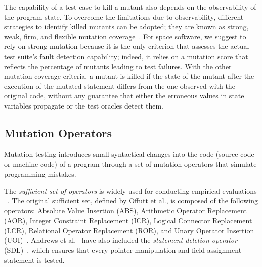 The capability of a test case to kill a mutant also depends on the observability of the program state. To overcome the limitations due to observability, different strategies to identify killed mutants can be adopted; they are known as strong, weak, firm, and flexible mutation coverage~\cite{ammann2016introduction}. For space software, we suggest to rely on strong mutation because it is the only criterion that assesses the actual test suite's fault detection capability; indeed, it relies on a mutation score that reflects the percentage of mutants leading to test failures. With the other mutation coverage criteria, a mutant is killed if the state of the mutant after the execution of the mutated statement differs from the one observed with the original code, without any guarantee that either the erroneous values in state variables propagate or the test oracles detect them. 




\subsection{Mutation Operators}
\label{sec:related:operators}

%


Mutation testing introduces small syntactical changes into the code (source code or machine code) of a program through a set of mutation operators that simulate programming mistakes. 



The  \emph{sufficient set of operators} is widely used for conducting empirical evaluations ~\cite{offutt1996experimental,rothermel1996experimental,andrews2005mutation,kintis2017detecting}. 
The original sufficient set, defined by Offutt et al., is composed of the following operators: Absolute Value Insertion (ABS), Arithmetic Operator Replacement (AOR), Integer Constraint Replacement (ICR), Logical Connector Replacement (LCR), Relational Operator Replacement (ROR), and Unary Operator Insertion (UOI)~\cite{offutt1996experimental}.
Andrews et al.~\cite{andrews2005mutation} have also included the 
\emph{statement deletion operator} (SDL)~\cite{delamaro2014designing}, which ensures that every pointer-manipulation and field-assignment statement is tested. 

